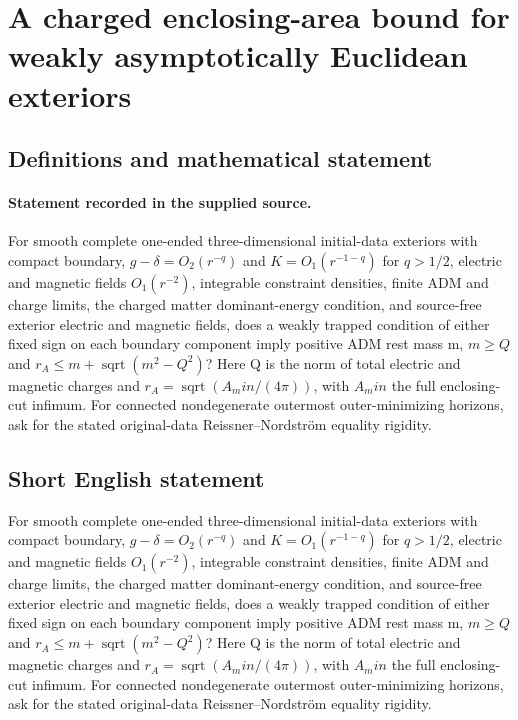 \documentclass[11pt]{article}
\begin{document}
\section*{A charged enclosing-area bound for weakly asymptotically Euclidean exteriors}\label{statement}
\subsection{Definitions and mathematical statement}
\paragraph{Statement recorded in the supplied source.}
For smooth complete one-ended three-dimensional initial-data exteriors with compact boundary, $g-\delta =O_2(r^{-q})$ and $K=O_1(r^{-1-q})$ for $q>1/2$, electric and magnetic fields $O_1(r^{-2})$, integrable constraint densities, finite ADM and charge limits, the charged matter dominant-energy condition, and source-free exterior electric and magnetic fields, does a weakly trapped condition of either fixed sign on each boundary component imply positive ADM rest mass m, $m\geq Q$ and $r_A\leq m+\operatorname{sqrt}(m^2-Q^2)$? Here Q is the norm of total electric and magnetic charges and $r_A=\operatorname{sqrt}(A_min/(4\pi ))$, with $A_min$ the full enclosing-cut infimum. For connected nondegenerate outermost outer-minimizing horizons, ask for the stated original-data Reissner–Nordström equality rigidity.
\subsection{Short English statement}
For smooth complete one-ended three-dimensional initial-data exteriors with compact boundary, $g-\delta =O_2(r^{-q})$ and $K=O_1(r^{-1-q})$ for $q>1/2$, electric and magnetic fields $O_1(r^{-2})$, integrable constraint densities, finite ADM and charge limits, the charged matter dominant-energy condition, and source-free exterior electric and magnetic fields, does a weakly trapped condition of either fixed sign on each boundary component imply positive ADM rest mass m, $m\geq Q$ and $r_A\leq m+\operatorname{sqrt}(m^2-Q^2)$? Here Q is the norm of total electric and magnetic charges and $r_A=\operatorname{sqrt}(A_min/(4\pi ))$, with $A_min$ the full enclosing-cut infimum. For connected nondegenerate outermost outer-minimizing horizons, ask for the stated original-data Reissner–Nordström equality rigidity.
\end{document}
